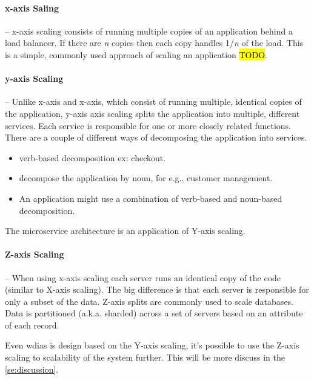 \paragraph{x-axis Saling}-- x-axis scaling consists of running multiple copies of an application behind a load balancer. If there are \textit{n} copies then each copy handles 1/\textit{n} of the load. This is a simple, commonly used approach of scaling an application \hl{TODO}.

\paragraph{y-axis Scaling}-- Unlike x-axis and x-axis, which consist of running multiple, identical copies of the application, y-axis axis scaling splits the application into multiple, different services. Each service is responsible for one or more closely related functions. There are a couple of different ways of decomposing the application into services.
\begin{itemize}
    \item verb-based decomposition ex: checkout.
    \item decompose the application by noun, for e.g., customer management. 
    \item An application might use a combination of verb-based and noun-based decomposition.
\end{itemize}
    
The microservice architecture is an application of Y-axis scaling.

\paragraph{Z-axis Scaling}-- When using x-axis scaling each server runs an identical copy of the code (similar to X-axis scaling). The big difference is that each server is responsible for only a subset of the data. 
Z-axis splits are commonly used to scale databases. Data is partitioned (a.k.a. sharded) across a set of servers based on an attribute of each record.

Even \acrshort{wdias} is design based on the Y-axis scaling, it's possible to use the Z-axis scaling to scalability of the system further. This will be more discuss in the \cref{se:discussion}.




